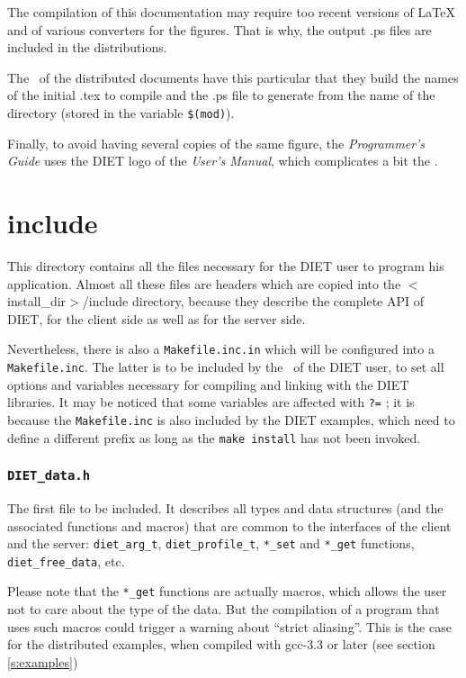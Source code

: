 The compilation of this documentation may require too recent versions of \LaTeX
and of various converters for the figures. That is why, the output \textsf{.ps}
files are included in the distributions.


The \makeam\ of the distributed documents have this particular that they build
the names of the initial \textsf{.tex} to compile and the \textsf{.ps} file to
generate from the name of the directory (stored in the variable \verb+$(mod)+).

Finally, to avoid having several copies of the same figure, the
\textit{Programmer's Guide} uses the DIET logo of the \textit{User's Manual},
which complicates a bit the \makeam.



\section{\textsf{include}}
\label{s:include}

This directory contains all the files necessary for the DIET user to program his
application. Almost all these files are headers which are copied into the
\textsf{$<$install\_dir$>$/include} directory, because they describe the
complete API of DIET, for the client side as well as for the server side.

Nevertheless, there is also a \texttt{Makefile.inc.in} which will be configured
into a \texttt{Makefile.inc}. The latter is to be included by the \make\ of the
DIET user, to set all options and variables necessary for compiling and linking
with the DIET libraries. It may be noticed that some variables are affected with
\texttt{?=} ; it is because the \texttt{Makefile.inc} is also included by the
DIET examples, which need to define a different prefix as long as the
\texttt{make install} has not been invoked.



\subsubsection{\tt DIET\_data.h}

The first file to be included. It describes all types and data structures (and
the associated functions and macros) that are common to the interfaces of the
client and the server: \verb+diet_arg_t+, \verb+diet_profile_t+, \verb+*_set+
and \verb+*_get+ functions, \verb+diet_free_data+, etc.

Please note that the \verb+*_get+ functions are actually macros, which allows
the user not to care about the type of the data. But the compilation of a
program that uses such macros could trigger a warning about ``strict aliasing''.
This is the case for the distributed examples, when compiled with
\textsf{gcc-3.3} or later (see section \ref{s:examples})



